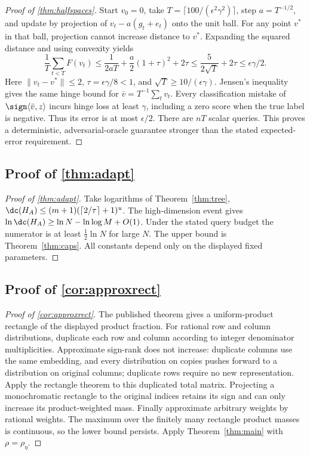 \begin{proof}[Proof of \cref{thm:halfspaces}]
Start $v_0=0$, take $T=\lceil100/(\epsilon^2\gamma^2)\rceil$, step $a=T^{-1/2}$, and update by projection of $v_t-a(g_t+e_t)$ onto the unit ball. For any point $v^*$ in that ball, projection cannot increase distance to $v^*$. Expanding the squared distance and using convexity yields
\[
 \frac1T\sum_{t<T}F(v_t)
 \le\frac1{2aT}+\frac a2(1+\tau)^2+2\tau
 \le\frac{5}{2\sqrt T}+2\tau
 \le\epsilon\gamma/2.
\]
Here $\|v_t-v^*\|\le2$, $\tau=\epsilon\gamma/8<1$, and $\sqrt T\ge10/(\epsilon\gamma)$. Jensen's inequality gives the same hinge bound for $\bar v=T^{-1}\sum_t v_t$. Every classification mistake of $\sign\langle\bar v,z\rangle$ incurs hinge loss at least $\gamma$, including a zero score when the true label is negative. Thus its error is at most $\epsilon/2$. There are $nT$ scalar queries. This proves a deterministic, adversarial-oracle guarantee stronger than the stated expected-error requirement.
\end{proof}

\subsection[Proof of result adapt]{Proof of \cref{thm:adapt}}\label{proof:adapt}
\begin{proof}[Proof of \cref{thm:adapt}]
Take logarithms of Theorem~\ref{thm:tree}, $\dc(H_A)\le(m+1)(\lceil2/\tau\rceil+1)^u$. The high-dimension event gives $\ln\dc(H_A)\ge\ln N-\ln\log M+O(1)$. Under the stated query budget the numerator is at least $\tfrac12\ln N$ for large $N$. The upper bound is Theorem~\ref{thm:caps}. All constants depend only on the displayed fixed parameters.
\end{proof}

\subsection[Proof of result approxrect]{Proof of \cref{cor:approxrect}}\label{proof:approxrect}
\begin{proof}[Proof of \cref{cor:approxrect}]
The published theorem gives a uniform-product rectangle of the displayed product fraction. For rational row and column distributions, duplicate each row and column according to integer denominator multiplicities. Approximate sign-rank does not increase: duplicate columns use the same embedding, and every distribution on copies pushes forward to a distribution on original columns; duplicate rows require no new representation. Apply the rectangle theorem to this duplicated total matrix. Projecting a monochromatic rectangle to the original indices retains its sign and can only increase its product-weighted mass. Finally approximate arbitrary weights by rational weights. The maximum over the finitely many rectangle product masses is continuous, so the lower bound persists. Apply Theorem~\ref{thm:main} with $\rho=\rho_\eta$.
\end{proof}
